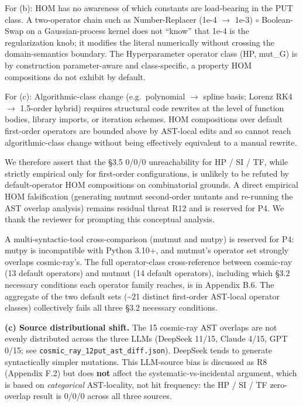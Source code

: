 \documentclass[review,12pt,authoryear]{elsarticle}
\begin{document}
For (b): HOM has no awareness of which constants are load-bearing in the
PUT class. A two-operator chain such as Number-Replacer (1e-4 $\to$ 1e-3) $\circ$
Boolean-Swap on a Gaussian-process kernel does not ``know'' that 1e-4 is
the regularization knob; it modifies the literal numerically without
crossing the domain-semantics boundary. The Hyperparameter operator
class (HP, mut\_G) is by construction parameter-aware and
class-specific, a property HOM compositions do not exhibit by default.

For (c): Algorithmic-class change (e.g.~polynomial $\to$ spline basis;
Lorenz RK4 $\to$ 1.5-order hybrid) requires structural code rewrites at the
level of function bodies, library imports, or iteration schemes. HOM
compositions over default first-order operators are bounded above by
AST-local edits and so cannot reach algorithmic-class change without
being effectively equivalent to a manual rewrite.

We therefore assert that the §3.5 0/0/0 unreachability for HP / SI / TF,
while strictly empirical only for first-order configurations, is
unlikely to be refuted by default-operator HOM compositions on
combinatorial grounds. A direct empirical HOM falsification (generating
mutmut second-order mutants and re-running the AST overlap analysis)
remains residual threat R12 and is reserved for P4. We thank the
reviewer for prompting this conceptual analysis.

A multi-syntactic-tool cross-comparison (mutmut and mutpy) is reserved
for P4: mutpy is incompatible with Python 3.10+, and mutmut's operator
set strongly overlaps cosmic-ray's. The full operator-class
cross-reference between cosmic-ray (13 default operators) and mutmut (14
default operators), including which §3.2 necessary conditions each
operator family reaches, is in Appendix B.6. The aggregate of the two
default sets (\textasciitilde21 distinct first-order AST-local operator
classes) collectively fails all three §3.2 necessary conditions.

\textbf{(c) Source distributional shift.} The 15 cosmic-ray AST
overlaps are not evenly distributed across the three LLMs (DeepSeek
11/15, Claude 4/15, GPT 0/15; see
\texttt{cosmic\_ray\_12put\_ast\_diff.json}). DeepSeek tends to generate
syntactically simpler mutations. This LLM-source bias is discussed as R8
(Appendix F.2) but does \textbf{not} affect the systematic-vs-incidental
argument, which is based on \emph{categorical} AST-locality, not hit
frequency: the HP / SI / TF zero-overlap result is 0/0/0 across all
three sources.
\end{document}
